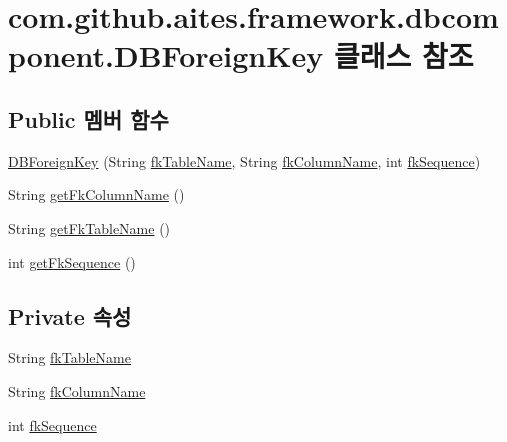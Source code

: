 \hypertarget{classcom_1_1github_1_1aites_1_1framework_1_1dbcomponent_1_1_d_b_foreign_key}{}\section{com.\+github.\+aites.\+framework.\+dbcomponent.\+D\+B\+Foreign\+Key 클래스 참조}
\label{classcom_1_1github_1_1aites_1_1framework_1_1dbcomponent_1_1_d_b_foreign_key}
\subsection*{Public 멤버 함수}
\begin{DoxyCompactItemize}
\item 
\mbox{\hyperlink{classcom_1_1github_1_1aites_1_1framework_1_1dbcomponent_1_1_d_b_foreign_key_ae690a7ce8e1785fd4667acd68b179ed1}{D\+B\+Foreign\+Key}} (String \mbox{\hyperlink{classcom_1_1github_1_1aites_1_1framework_1_1dbcomponent_1_1_d_b_foreign_key_a3d52e561c9c88175073171fe085fa59f}{fk\+Table\+Name}}, String \mbox{\hyperlink{classcom_1_1github_1_1aites_1_1framework_1_1dbcomponent_1_1_d_b_foreign_key_ac28d05682ddf930d7ede1c4fdf3f4993}{fk\+Column\+Name}}, int \mbox{\hyperlink{classcom_1_1github_1_1aites_1_1framework_1_1dbcomponent_1_1_d_b_foreign_key_acfa6d7ed488af53aeec44f6d7b8ced59}{fk\+Sequence}})
\item 
String \mbox{\hyperlink{classcom_1_1github_1_1aites_1_1framework_1_1dbcomponent_1_1_d_b_foreign_key_a8b9547c0bd41ad9f532d18fef81e8292}{get\+Fk\+Column\+Name}} ()
\item 
String \mbox{\hyperlink{classcom_1_1github_1_1aites_1_1framework_1_1dbcomponent_1_1_d_b_foreign_key_ae667a130571c971fc23f58a081c134c1}{get\+Fk\+Table\+Name}} ()
\item 
int \mbox{\hyperlink{classcom_1_1github_1_1aites_1_1framework_1_1dbcomponent_1_1_d_b_foreign_key_a943706e61684742aba9c4efd062185ca}{get\+Fk\+Sequence}} ()
\end{DoxyCompactItemize}
\subsection*{Private 속성}
\begin{DoxyCompactItemize}
\item 
String \mbox{\hyperlink{classcom_1_1github_1_1aites_1_1framework_1_1dbcomponent_1_1_d_b_foreign_key_a3d52e561c9c88175073171fe085fa59f}{fk\+Table\+Name}}
\item 
String \mbox{\hyperlink{classcom_1_1github_1_1aites_1_1framework_1_1dbcomponent_1_1_d_b_foreign_key_ac28d05682ddf930d7ede1c4fdf3f4993}{fk\+Column\+Name}}
\item 
int \mbox{\hyperlink{classcom_1_1github_1_1aites_1_1framework_1_1dbcomponent_1_1_d_b_foreign_key_acfa6d7ed488af53aeec44f6d7b8ced59}{fk\+Sequence}}
\end{DoxyCompactItemize}


